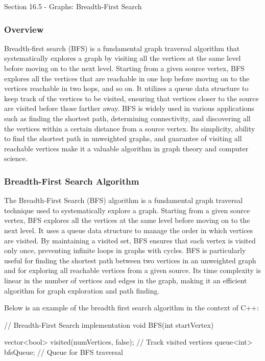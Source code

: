 \begin{notes}{Section 16.5 - Graphs: Breadth-First Search}
    \subsubsection*{Overview}

    Breadth-first search (BFS) is a fundamental graph traversal algorithm that systematically explores a graph by visiting all the vertices at the same level before moving on to the next level. Starting from a given source 
    vertex, BFS explores all the vertices that are reachable in one hop before moving on to the vertices reachable in two hops, and so on. It utilizes a queue data structure to keep track of the vertices to be visited, ensuring 
    that vertices closer to the source are visited before those farther away. BFS is widely used in various applications such as finding the shortest path, determining connectivity, and discovering all the vertices within a certain 
    distance from a source vertex. Its simplicity, ability to find the shortest path in unweighted graphs, and guarantee of visiting all reachable vertices make it a valuable algorithm in graph theory and computer science.
    
    \subsubsection*{Breadth-First Search Algorithm}
    
    The Breadth-First Search (BFS) algorithm is a fundamental graph traversal technique used to systematically explore a graph. Starting from a given source vertex, BFS explores all the vertices at the same level before moving on to 
    the next level. It uses a queue data structure to manage the order in which vertices are visited. By maintaining a visited set, BFS ensures that each vertex is visited only once, preventing infinite loops in graphs with cycles. 
    BFS is particularly useful for finding the shortest path between two vertices in an unweighted graph and for exploring all reachable vertices from a given source. Its time complexity is linear in the number of vertices and edges 
    in the graph, making it an efficient algorithm for graph exploration and path finding.
    
    \begin{highlight}
        Below is an example of the breadth first search algorithm in the context of C++:
    
    \begin{code}[C++]
    // Breadth-First Search implementation
    void BFS(int startVertex) {
        vector<bool> visited(numVertices, false); // Track visited vertices
        queue<int> bfsQueue; // Queue for BFS traversal
    
}
\end{code}
\end{highlight}
\end{notes}
